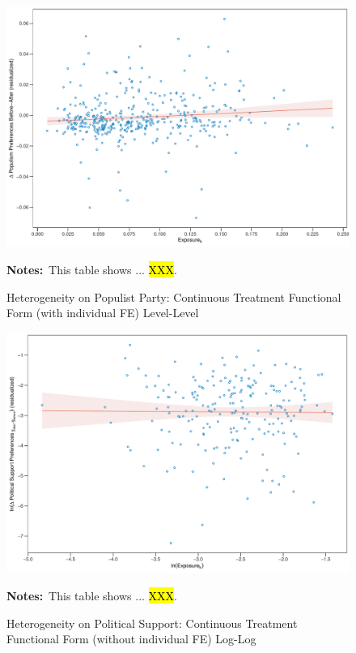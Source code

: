 \documentclass[11pt]{article}
\begin{document}
\begin{figure}[htbp!]
    \centering
    \caption{Heterogeneity on Populist Party: Continuous Treatment Functional Form (with individual FE) Level-Level}\label{fig:pp_functional_form_cbk_past_mean_ife_levels}
    \includegraphics[width=1\linewidth]{heterogeneity/pp_functional_form_cbk_past_mean_ife_levels}
    \begin{tablenotes}
        \footnotesize
        \item \textbf{Notes:}~This table shows ... \hl{XXX}.
    \end{tablenotes} 
\end{figure}

\begin{figure}[htbp!]
    \centering
    \caption{Heterogeneity on Political Support: Continuous Treatment Functional Form (without individual FE) Log-Log}\label{fig:ps_functional_form_cbk_past_mean_noife_logs}
    \includegraphics[width=1\linewidth]{heterogeneity/ps_functional_form_cbk_past_mean_noife_logs}
    \begin{tablenotes}
        \footnotesize
        \item \textbf{Notes:}~This table shows ... \hl{XXX}.
    \end{tablenotes} 
\end{figure}
\end{document}
